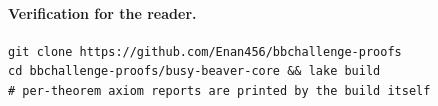 \documentclass[11pt]{article}
\begin{document}
\paragraph{Verification for the reader.}
\begin{verbatim}
git clone https://github.com/Enan456/bbchallenge-proofs
cd bbchallenge-proofs/busy-beaver-core && lake build
# per-theorem axiom reports are printed by the build itself
\end{verbatim}
\end{document}
